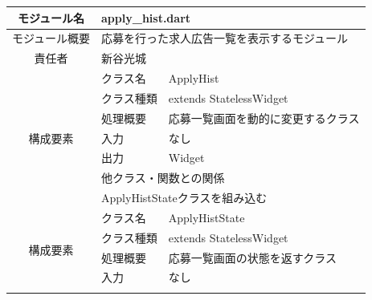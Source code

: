 \begin{table}[H]
  \centering
  \begin{tabular}{|c|l|l|} \hline
    モジュール名                & \multicolumn{2}{l|}{apply\_hist.dart}                                                            \\ \hline
    モジュール概要               & \multicolumn{2}{p{12cm}|}{応募を行った求人広告一覧を表示するモジュール}                                                \\ \hline
    責任者                   & \multicolumn{2}{l|}{新谷光城}                                                                        \\ \hline
    \multirow{7}{*}{構成要素} & クラス名                                              & ApplyHist                                    \\ \cline{2-3}
                          & クラス種類                                             & extends StatelessWidget                      \\ \cline{2-3}
                          & 処理概要                                              & \multicolumn{1}{p{12cm}|}{応募一覧画面を動的に変更するクラス} \\ \cline{2-3}
                          & 入力                                                & なし                                           \\ \cline{2-3}
                          & 出力                                                & Widget                                       \\ \cline{2-3}
                          & \multicolumn{2}{l|}{他クラス・関数との関係}                                                                 \\ \cline{2-3}
                          & \multicolumn{2}{p{14cm}|}{ApplyHistStateクラスを組み込む}                                                \\ \hline
    \multirow{7}{*}{構成要素} & クラス名                                              & ApplyHistState                               \\ \cline{2-3}
                          & クラス種類                                             & extends StatelessWidget                      \\ \cline{2-3}
                          & 処理概要                                              & \multicolumn{1}{p{12cm}|}{応募一覧画面の状態を返すクラス}   \\ \cline{2-3}
                          & 入力                                                & なし                                           \\ \cline{2-3}

\end{tabular}
\end{table}
